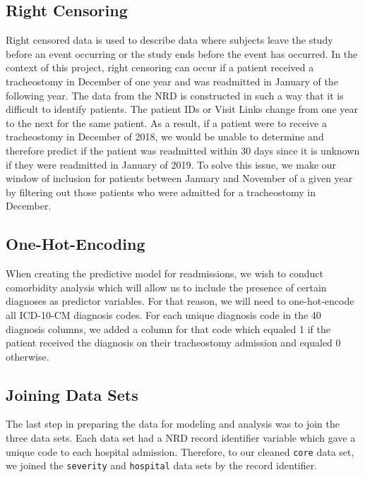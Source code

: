 \documentclass[sn-basic,pdflatex]{sn-jnl}
\theoremstyle{remark}
\theoremstyle{definition}
\begin{document}
\hypertarget{right-censoring}{%
\subsection{Right Censoring}\label{right-censoring}}

Right censored data is used to describe data where subjects leave the
study before an event occurring or the study ends before the event has
occurred. In the context of this project, right censoring can occur if a
patient received a tracheostomy in December of one year and was
readmitted in January of the following year. The data from the NRD is
constructed in such a way that it is difficult to identify patients. The
patient IDs or Visit Links change from one year to the next for the same
patient. As a result, if a patient were to receive a tracheostomy in
December of 2018, we would be unable to determine and therefore predict
if the patient was readmitted within 30 days since it is unknown if they
were readmitted in January of 2019. To solve this issue, we make our
window of inclusion for patients between January and November of a given
year by filtering out those patients who were admitted for a
tracheostomy in December.

\hypertarget{one-hot-encoding}{%
\subsection{One-Hot-Encoding}\label{one-hot-encoding}}

When creating the predictive model for readmissions, we wish to conduct
comorbidity analysis which will allow us to include the presence of
certain diagnoses as predictor variables. For that reason, we will need
to one-hot-encode all ICD-10-CM diagnosis codes. For each unique
diagnosis code in the 40 diagnosis columns, we added a column for that
code which equaled 1 if the patient received the diagnosis on their
tracheostomy admission and equaled 0 otherwise.

\hypertarget{joining-data-sets}{%
\subsection{Joining Data Sets}\label{joining-data-sets}}

The last step in preparing the data for modeling and analysis was to
join the three data sets. Each data set had a NRD record identifier
variable which gave a unique code to each hospital admission. Therefore,
to our cleaned \texttt{core} data set, we joined the \texttt{severity}
and \texttt{hospital} data sets by the record identifier.
\end{document}
